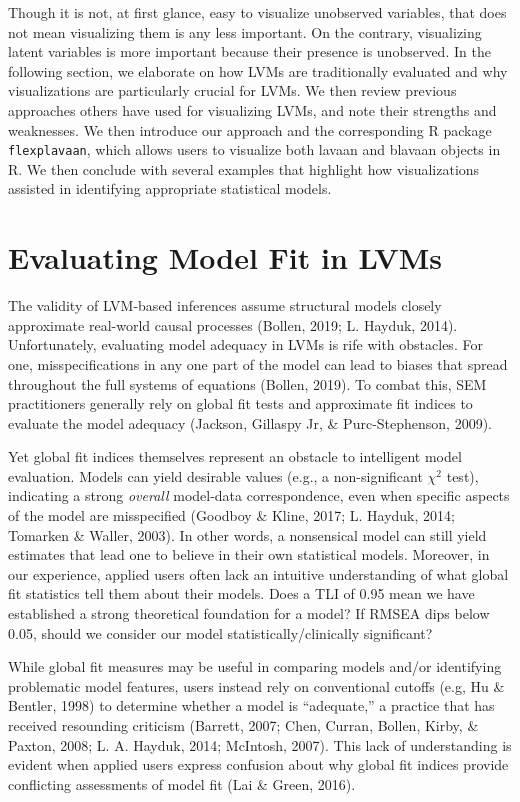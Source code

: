 \documentclass[
  english,
  doc]{apa6}
\begin{document}
Though it is not, at first glance, easy to visualize unobserved variables, that does not mean visualizing them is any less important. On the contrary, visualizing latent variables is more important because their presence is unobserved. In the following section, we elaborate on how LVMs are traditionally evaluated and why visualizations are particularly crucial for LVMs. We then review previous approaches others have used for visualizing LVMs, and note their strengths and weaknesses. We then introduce our approach and the corresponding R package \texttt{flexplavaan}, which allows users to visualize both lavaan and blavaan objects in R. We then conclude with several examples that highlight how visualizations assisted in identifying appropriate statistical models.

\hypertarget{evaluating-model-fit-in-lvms}{%
\section{Evaluating Model Fit in LVMs}\label{evaluating-model-fit-in-lvms}}

The validity of LVM-based inferences assume structural models closely approximate real-world causal processes (Bollen, 2019; L. Hayduk, 2014). Unfortunately, evaluating model adequacy in LVMs is rife with obstacles. For one, misspecifications in any one part of the model can lead to biases that spread throughout the full systems of equations (Bollen, 2019). To combat this, SEM practitioners generally rely on global fit tests and approximate fit indices to evaluate the model adequacy (Jackson, Gillaspy Jr, \& Purc-Stephenson, 2009).

Yet global fit indices themselves represent an obstacle to intelligent model evaluation. Models can yield desirable values (e.g., a non-significant \(\chi^2\) test), indicating a strong \emph{overall} model-data correspondence, even when specific aspects of the model are misspecified (Goodboy \& Kline, 2017; L. Hayduk, 2014; Tomarken \& Waller, 2003). In other words, a nonsensical model can still yield estimates that lead one to believe in their own statistical models. Moreover, in our experience, applied users often lack an intuitive understanding of what global fit statistics tell them about their models. Does a TLI of 0.95 mean we have established a strong theoretical foundation for a model? If RMSEA dips below 0.05, should we consider our model statistically/clinically significant?

While global fit measures may be useful in comparing models and/or identifying problematic model features, users instead rely on conventional cutoffs (e.g, Hu \& Bentler, 1998) to determine whether a model is ``adequate,'' a practice that has received resounding criticism (Barrett, 2007; Chen, Curran, Bollen, Kirby, \& Paxton, 2008; L. A. Hayduk, 2014; McIntosh, 2007). This lack of understanding is evident when applied users express confusion about why global fit indices provide conflicting assessments of model fit (Lai \& Green, 2016).
\end{document}
